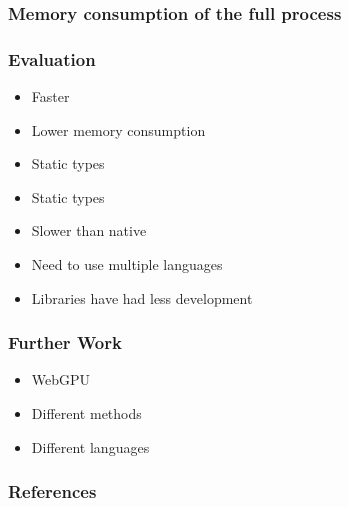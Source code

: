 \documentclass{beamer}
\begin{document}
\begin{frame}
    \frametitle{Memory consumption of the full process}
    \begin{figure}[H]
        \centering
    \end{figure}
\end{frame}




\begin{frame}
    \frametitle{Evaluation}
    \begin{itemize}
        \item[\Checkmark] Faster
        \item[\Checkmark] Lower memory consumption
        \item[\Checkmark] Static types
        \item[\XSolidBrush] Static types
        \item[\XSolidBrush] Slower than native
        \item[\XSolidBrush] Need to use multiple languages
        \item[\XSolidBrush] Libraries have had less development
    \end{itemize}
\end{frame}

\begin{frame}
    \frametitle{Further Work}
    \begin{itemize}
        \item WebGPU
        \item Different methods
        \item Different languages
    \end{itemize}
\end{frame}

\begin{frame}[allowframebreaks]
    \frametitle{References}
    \printbibliography
\end{frame}
\end{document}
